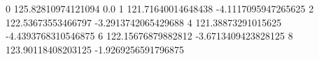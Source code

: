0 125.82810974121094 0.0
1 121.71640014648438 -4.1117095947265625
2 122.53673553466797 -3.2913742065429688
4 121.38873291015625 -4.4393768310546875
6 122.15676879882812 -3.6713409423828125
8 123.90118408203125 -1.9269256591796875
